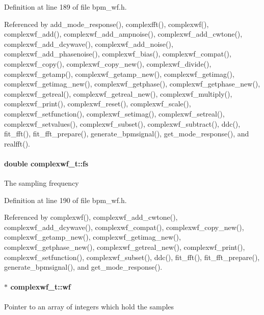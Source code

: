 Definition at line 189 of file bpm\_\-wf.h.

Referenced by add\_\-mode\_\-response(), complexfft(), complexwf(), complexwf\_\-add(), complexwf\_\-add\_\-ampnoise(), complexwf\_\-add\_\-cwtone(), complexwf\_\-add\_\-dcywave(), complexwf\_\-add\_\-noise(), complexwf\_\-add\_\-phasenoise(), complexwf\_\-bias(), complexwf\_\-compat(), complexwf\_\-copy(), complexwf\_\-copy\_\-new(), complexwf\_\-divide(), complexwf\_\-getamp(), complexwf\_\-getamp\_\-new(), complexwf\_\-getimag(), complexwf\_\-getimag\_\-new(), complexwf\_\-getphase(), complexwf\_\-getphase\_\-new(), complexwf\_\-getreal(), complexwf\_\-getreal\_\-new(), complexwf\_\-multiply(), complexwf\_\-print(), complexwf\_\-reset(), complexwf\_\-scale(), complexwf\_\-setfunction(), complexwf\_\-setimag(), complexwf\_\-setreal(), complexwf\_\-setvalues(), complexwf\_\-subset(), complexwf\_\-subtract(), ddc(), fit\_\-fft(), fit\_\-fft\_\-prepare(), generate\_\-bpmsignal(), get\_\-mode\_\-response(), and realfft().
\paragraph[fs]{\setlength{\rightskip}{0pt plus 5cm}double {\bf complexwf\_\-t::fs}}\hfill\label{structcomplexwf__t_9b20d8d502ef45df29ecd14781cf06ac}


The sampling frequency 

Definition at line 190 of file bpm\_\-wf.h.

Referenced by complexwf(), complexwf\_\-add\_\-cwtone(), complexwf\_\-add\_\-dcywave(), complexwf\_\-compat(), complexwf\_\-copy\_\-new(), complexwf\_\-getamp\_\-new(), complexwf\_\-getimag\_\-new(), complexwf\_\-getphase\_\-new(), complexwf\_\-getreal\_\-new(), complexwf\_\-print(), complexwf\_\-setfunction(), complexwf\_\-subset(), ddc(), fit\_\-fft(), fit\_\-fft\_\-prepare(), generate\_\-bpmsignal(), and get\_\-mode\_\-response().
\paragraph[wf]{$\ast$ {\bf complexwf\_\-t::wf}}\hfill\label{structcomplexwf__t_9e02fc80ee52a0035e84bbc1a9fbb128}


Pointer to an array of integers which hold the samples 


